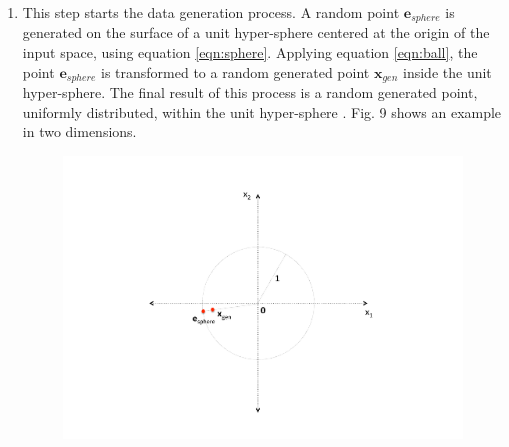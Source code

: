\documentclass[parskip=full]{scrartcl}
\begin{document}
\begin{enumerate}
	\item This step starts the data generation process. A random point \(
	\textbf{e}_{sphere} \) is generated on the surface of a unit hyper-sphere
	centered at the origin of the input space, using equation
	\eqref{eqn:sphere}. Applying equation \eqref{eqn:ball}, the point \(
	\textbf{e}_{sphere} \) is transformed to a random generated point \(
	\textbf{x}_{gen} \) inside the unit hyper-sphere. The final result of this
	process is a random generated point, uniformly distributed, within the unit
	hyper-sphere \cite{DasGupta2011}. Fig. 9 shows an example in two dimensions.

	\begin{figure}[H]
		\centering
		\includegraphics[width=12cm, keepaspectratio]{./artifacts/fig9}
	\end{figure}


\end{enumerate}
\end{document}
